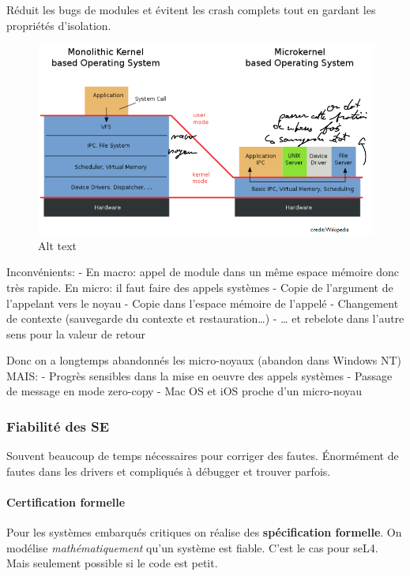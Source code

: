 Réduit les bugs de modules et évitent les crash complets tout en gardant
les propriétés d'isolation.

\begin{figure}
\centering
\includegraphics{image-21.png}
\caption{Alt text}
\end{figure}

Inconvénients: - En macro: appel de module dans un même espace mémoire
donc très rapide. En micro: il faut faire des appels systèmes - Copie de
l'argument de l'appelant vers le noyau - Copie dans l'espace mémoire de
l'appelé - Changement de contexte (sauvegarde du contexte et
restauration\ldots) - \ldots{} et rebelote dans l'autre sens pour la
valeur de retour

Donc on a longtemps abandonnés les micro-noyaux (abandon dans Windows
NT) MAIS: - Progrès sensibles dans la mise en oeuvre des appels systèmes
- Passage de message en mode zero-copy - Mac OS et iOS proche d'un
micro-noyau

\subsubsection{Fiabilité des SE}\label{fiabilituxe9-des-se}

Souvent beaucoup de temps nécessaires pour corriger des fautes.
Énormément de fautes dans les drivers et compliqués à débugger et
trouver parfois.

\paragraph{Certification formelle}\label{certification-formelle}

Pour les systèmes embarqués critiques on réalise des
\textbf{spécification formelle}. On modélise \emph{mathématiquement}
qu'un système est fiable. C'est le cas pour seL4. Mais seulement
possible si le code est petit.

